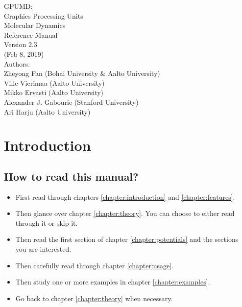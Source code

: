 \documentclass[12pt,a4paper]{report}
\begin{document}
\begin{center}
  \huge
  {
   \vspace*{1.0cm}
   GPUMD: \\
   Graphics Processing Units \\
   Molecular Dynamics\\
   \vspace*{1.0cm}
   Reference Manual\\
   \vspace*{1.0cm}
   Version 2.3\\
   \vspace*{1.0cm}
   (Feb 8, 2019)\\
  \vspace*{2.0cm}
  }
  \large
  {
  Authors: \\
  Zheyong Fan (Bohai University \& Aalto University)\\
  Ville Vierimaa (Aalto University)\\
  Mikko Ervasti (Aalto University)\\
  Alexander J. Gabourie (Stanford University)\\
  Ari Harju (Aalto University)\\
  }
  \vspace*{1.0cm}
\end{center}


\tableofcontents


\chapter{Introduction\label{chapter:introduction}}

\section{How to read this manual?}

\begin{itemize}
\item First read through chapters \ref{chapter:introduction} and \ref{chapter:features}.
\item Then glance over chapter \ref{chapter:theory}. You can choose to either read through it or skip it.
\item Then read the first section of chapter \ref{chapter:potentials} and the sections you are interested.
\item Then carefully read through chapter \ref{chapter:usage}.
\item Then study one or more examples in chapter \ref{chapter:examples}.
\item Go back to chapter \ref{chapter:theory} when necessary.
\end{itemize}
\end{document}

